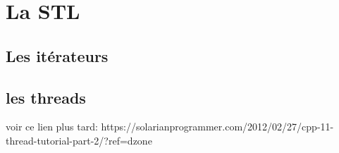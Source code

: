 \documentclass[onecolumn]{book}%
\begin{document}
\chapter{La STL}
\section{Les it\'erateurs}
\section{les threads}
voir ce lien plus tard: https://solarianprogrammer.com/2012/02/27/cpp-11-thread-tutorial-part-2/?ref=dzone
\printindex
\end{document}
